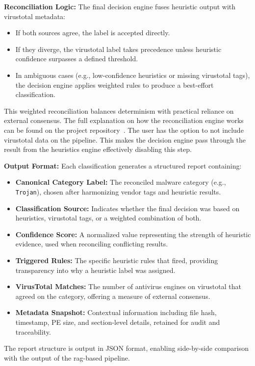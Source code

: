 \vspace{0.5em}
\noindent\textbf{Reconciliation Logic:} The final decision engine fuses heuristic output with
\gls{virustotal} metadata:
\begin{itemize}
      \item If both sources agree, the label is accepted directly.
      \item If they diverge, the \gls{virustotal} label takes precedence unless heuristic confidence surpasses
            a defined threshold.
      \item In ambiguous cases (e.g., low-confidence heuristics or missing \gls{virustotal} tags), the decision
            engine applies weighted rules to produce a best-effort classification.
\end{itemize}
This weighted reconciliation balances determinism with practical reliance on external consensus.
The full explanation on how the reconciliation engine works can be found on the project
repository~\cite{rexisReconciliationGuide}.
The user has the option to not include \gls{virustotal} data on the pipeline. This makes the
decision engine pass through the result from the heuristics engine effectively disabling this step.

\vspace{0.5em}
\noindent\textbf{Output Format:} Each classification generates a structured report containing:
\begin{itemize}
      \item \textbf{Canonical Category Label:} The reconciled malware category (e.g., \texttt{Trojan}),
            chosen after harmonizing vendor tags and heuristic results.
      \item \textbf{Classification Source:} Indicates whether the final decision was based on
            heuristics, \gls{virustotal} tags, or a weighted combination of both.
      \item \textbf{Confidence Score:} A normalized value representing the strength of heuristic
            evidence, used when reconciling conflicting results.
      \item \textbf{Triggered Rules:} The specific heuristic rules that fired, providing transparency
            into why a heuristic label was assigned.
      \item \textbf{VirusTotal Matches:} The number of antivirus engines on \gls{virustotal} that
            agreed on the category, offering a measure of external consensus.
      \item \textbf{Metadata Snapshot:} Contextual information including file hash, timestamp, PE
            size, and section-level details, retained for audit and traceability.
\end{itemize}
The report structure is output in JSON format, enabling side-by-side comparison with the output of
the \gls{rag}-based pipeline.

